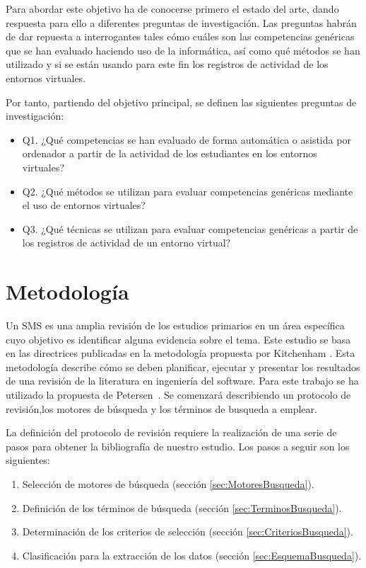 Para abordar este objetivo ha de conocerse primero el estado del arte, dando respuesta para ello a diferentes preguntas de investigación. Las preguntas habrán de dar repuesta a interrogantes tales cómo cuáles son las competencias genéricas que se han evaluado haciendo uso de la informática, así como qué métodos se han utilizado y si se están usando para este fin los registros de actividad de los entornos virtuales.

\bigskip
Por tanto, partiendo del objetivo principal, se definen las siguientes preguntas de investigación:
\begin{itemize}
\item Q1. ¿Qué competencias se han evaluado de forma automática o asistida por ordenador a partir de la actividad de los estudiantes en los entornos virtuales?
\item Q2. ¿Qué métodos se utilizan para evaluar competencias genéricas mediante el uso de entornos virtuales?
\item Q3. ¿Qué técnicas se utilizan para evaluar competencias genéricas a partir de los registros de actividad de un entorno virtual?
\end{itemize}

\section{Metodología}

Un SMS es una amplia revisión de los estudios primarios en un área específica cuyo objetivo es identificar alguna evidencia sobre el tema. Este estudio se basa en las directrices publicadas en la metodología propuesta por Kitchenham \cite{Kitchenham:2010}. Esta metodología describe cómo se deben planificar, ejecutar y presentar los resultados de una revisión de la literatura en ingeniería del software. Para este trabajo se ha utilizado la propuesta de Petersen~\cite{Petersen:2008}. Se comenzará describiendo un protocolo de revisión,los motores de búsqueda y los términos de busqueda a emplear.

La definición del protocolo de revisión requiere la realización de una serie de pasos para obtener la bibliografía de nuestro estudio. Los pasos a seguir son los siguientes:
\begin{enumerate}
\item Selección de motores de búsqueda (sección \ref{sec:MotoresBusqueda}).
\item Definición de los términos de búsqueda (sección \ref{sec:TerminosBusqueda}).
\item Determinación de los criterios de selección (sección \ref{sec:CriteriosBusqueda}).
\item Clasificación para la extracción de los datos (sección \ref{sec:EsquemaBusqueda}).
\end{enumerate}

